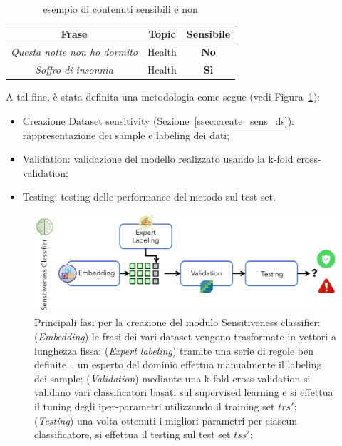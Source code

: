 \begin{table}[h]

\centering
\begin{tabular}{c|c|c}
\hline
\textbf{Frase} & \textbf{Topic} & \textbf{Sensibile} \\ \hline
\textit{Questa notte non ho dormito} & Health & \textbf{No} \\ \hline
\textit{Soffro di insonnia} & Health & \textbf{Sì} \\ \hline
\end{tabular}
\caption{esempio di contenuti sensibili e non}
\label{tbl:example_sens}
\end{table}
\FloatBarrier

A tal fine, è stata definita una metodologia come segue (vedi Figura~\ref{fig:methodsens}):
\begin{itemize}
    \item Creazione Dataset sensitivity (Sezione~\ref{ssec:create_sens_ds}): rappresentazione dei sample e labeling dei dati;
    \item Validation: validazione del modello realizzato usando la k-fold cross-validation;
    \item Testing: testing delle performance del metodo sul test set.
\end{itemize}

\begin{figure}[h!t]
    \centering
    \includegraphics[width=15cm]{Figure/grafici/sensitivenessmethod_cropped.pdf}
    \caption{Principali fasi per la creazione del modulo Sensitiveness classifier: (\textit{Embedding}) le frasi dei vari dataset vengono trasformate in vettori a lunghezza fissa; (\textit{Expert labeling}) tramite una serie di regole ben definite~\cite{}, un esperto del dominio effettua manualmente il labeling dei sample; (\textit{Validation}) mediante una k-fold cross-validation si validano vari classificatori basati sul supervised learning e si effettua il tuning degli iper-parametri utilizzando il training set $trs'$; (\textit{Testing}) una volta ottenuti i migliori parametri per ciascun classificatore, si effettua il testing sul test set $tss'$;   }
    \label{fig:methodsens}
\end{figure}

